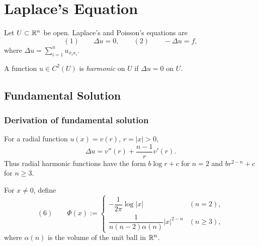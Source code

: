 \section{Laplace's Equation}
\label{sec:laplaces-equation}

Let $U\subset\mathbb{R}^n$ be open. Laplace's and Poisson's equations are
$$(1)\qquad \Delta u=0,
\qquad
(2)\qquad -\Delta u=f,$$
where $\Delta u=\sum_{i=1}^n u_{x_i x_i}$.

\begin{definition}
\label{def:harmonic-function}



A function $u\in C^2(U)$ is \emph{harmonic} on $U$ if $\Delta u=0$ on $U$.
\end{definition}

\subsection{Fundamental Solution}
\label{sec:laplace-fundamental-solution}

\subsubsection{Derivation of fundamental solution}
\label{sec:laplace-fundamental-solution-derivation}

For a radial function $u(x)=v(r)$, $r=|x|>0$,
$$\Delta u=v''(r)+\frac{n-1}{r}v'(r).$$
Thus radial harmonic functions have the form $b\log r+c$ for $n=2$ and
$br^{2-n}+c$ for $n\ge3$.

\begin{definition}
\label{def:fundamental-solution-laplace}





For $x\ne0$, define
$$(6)\qquad
\Phi(x):=
\begin{cases}
-\dfrac{1}{2\pi}\log|x|&(n=2),\\[3pt]
\dfrac{1}{n(n-2)\alpha(n)}|x|^{2-n}&(n\ge3),
\end{cases}$$
where $\alpha(n)$ is the volume of the unit ball in $\mathbb{R}^n$.
\end{definition}

